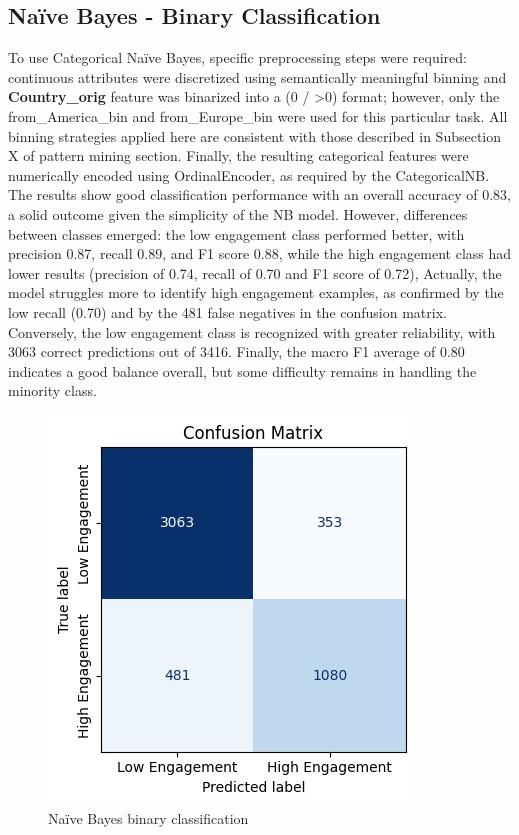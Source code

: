\subsection{Naïve Bayes - Binary Classification}
To use Categorical Naïve Bayes, specific preprocessing steps were required: continuous attributes were discretized using semantically meaningful binning and \textbf{Country\_orig} feature was binarized into a (0 / >0) format; 
however, only the from\_America\_bin  and from\_Europe\_bin were used for this particular task. 
All binning strategies applied here are consistent with those described in Subsection X of pattern mining section. 
Finally, the resulting categorical features were numerically encoded using OrdinalEncoder, as required by the CategoricalNB.\\
The results show good classification performance with an overall accuracy of 0.83, a solid outcome given the simplicity of the NB model.
However, differences between classes emerged: the low engagement class performed better, with precision 0.87, recall 0.89, and F1 score 0.88, while the high engagement class had lower results 
(precision of 0.74, recall of 0.70 and F1 score of 0.72), 
Actually, the model struggles more to identify high engagement examples, as confirmed by the low recall (0.70) and by the 481 false negatives in the confusion matrix. 
Conversely, the low engagement class is recognized with greater reliability, with 3063 correct predictions out of 3416.
Finally, the macro F1 average of 0.80 indicates a good balance overall, but some difficulty remains in handling the minority class.
\begin{figure}[H]
    \centering
    \includegraphics[width=0.30\linewidth]{plots/nb_binary_confmatrix.jpg}
    \captionsetup{justification=centering, width=0.9\linewidth}
    \caption{Naïve Bayes binary classification}
    \label{fig:nb_binary}
\end{figure}


